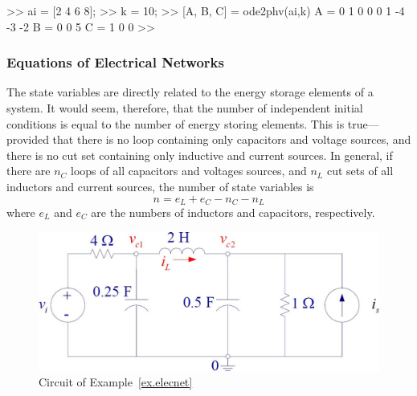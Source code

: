 \begin{codex}
>> ai = [2 4 6 8];
>> k = 10;
>> [A, B, C] = ode2phv(ai,k)
A =
    0   1   0
    0   0   1
    -4  -3  -2
B =
    0
    0
    5
C =
    1   0   0
>>
\end{codex}

\subsubsection{Equations of Electrical Networks}
The state variables are directly related to the energy storage elements of a system.  It would seem, therefore, that the number of independent initial conditions is equal to the  number of energy storing elements.  This is true---provided that there is no loop containing only capacitors and voltage sources, and there is no cut set containing only inductive and current sources. In general, if there are $n_C$ loops of all capacitors and voltages sources, and $n_L$ cut sets of all inductors and current sources, the number of state variables is
\begin{equation}
    n = e_L + e_C - n_C - n_L
\end{equation}
where $e_L$ and $e_C$ are the numbers of inductors and capacitors, respectively.

\begin{figure}[bth]
\centering
\includegraphics[width=.6\textwidth]{statespaceelecnet}
\caption{\footnotesize
        Circuit of Example~\ref{ex.elecnet}
        \label{fig.statespace.elecnet}
        }
\end{figure}

